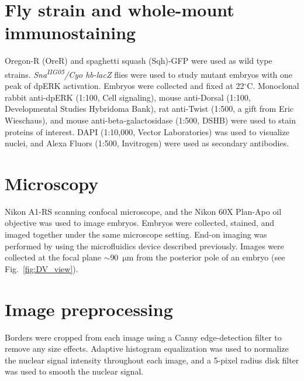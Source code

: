 \documentclass{pnastwo}
\newcommand{\fig}[0]{Fig.}
\begin{document}
\begin{article}




\begin{materials}

\section{Fly strain and whole-mount immunostaining}
%
Oregon-R (OreR) and spaghetti squash (Sqh)-GFP were used as wild type strains. 
%
{\it Sna\textsuperscript{\it IIG05}/Cyo hb-lacZ} flies were used to study mutant embryos with one peak of dpERK activation.  
%
Embryos were collected and fixed at 22$^\circ$C. 
%
Monoclonal rabbit anti-dpERK (1:100, Cell signaling), mouse anti-Dorsal (1:100, Developmental Studies Hybridoma Bank), rat anti-Twist (1:500, a gift from Eric Wieschaus), and mouse anti-beta-galactosidase (1:500, DSHB) were used to stain proteins of interest. DAPI (1:10,000, Vector Laboratories) was used to visualize nuclei, and Alexa Fluors (1:500, Invitrogen) were used as secondary antibodies. 

\section{Microscopy}
%
Nikon A1-RS scanning confocal microscope, and the Nikon 60X Plan-Apo oil objective was used to image embryos. Embryos were collected, stained, and imaged together under the same microscope setting. End-on imaging was performed by using the microfluidics device described previously. Images were collected at the focal plane $\sim$90~$\mathrm{\mu m}$ from the posterior pole of an embryo (see \fig~\ref{fig:DV_view}). 

\section{Image preprocessing}
%
Borders were cropped from each image using a Canny edge-detection filter to remove any size effects.
%
Adaptive histogram equalization was used to normalize the nuclear signal intensity throughout each image, and a 5-pixel radius disk filter was used to smooth the nuclear signal. 
%


\end{materials}
\end{article}
\end{document}
